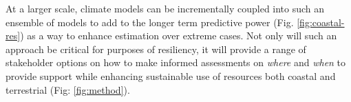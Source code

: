 At a larger scale, climate models can be incrementally coupled into
such an ensemble of models to add to the longer term predictive power
(Fig. \ref{fig:coastal-res}) as a way to enhance estimation over
extreme cases. Not only will such an approach be critical for purposes
of resiliency, it will provide a range of stakeholder options on how
to make informed assessments on \emph{where} and \emph{when} to
provide support while enhancing sustainable use of resources both
coastal and terrestrial (Fig: \ref{fig:method}).

